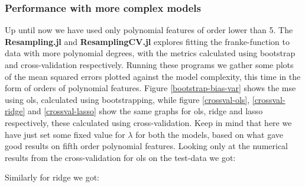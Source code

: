 \documentclass{article}
\begin{document}
\subsubsection{Performance with more complex models}
Up until now we have used only polynomial features of order lower than 5. The
\textbf{Resampling.jl} and \textbf{ResamplingCV.jl} explores fitting the
franke-function to data with more polynomial degrees, with the metrics
calculated using bootstrap and cross-validation respectively. Running these
programs we gather some plots of the mean squared errors plotted against the
model complexity, this time in the form of orders of polynomial features. Figure
\ref{bootstrap-bias-var} shows the mse using ols, calculated using
bootstrapping, while figure \ref{crossval-ols}, \ref{crossval-ridge} and
\ref{crossval-lasso} show the same graphs for ols, ridge and lasso respectively,
these calculated using cross-validation. Keep in mind that here we have just set
some fixed value for $\lambda$ for both the models, based on what gave good
results on fifth order polynomial features. Looking only at the numerical
results from the cross-validation for ols on the test-data we got:

\begin{table}[htpb!]
\end{table}

Similarly for ridge we got:

\begin{table}[htpb!]
\end{table}
\end{document}
